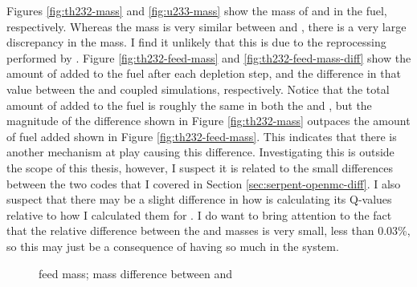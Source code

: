 Figures \ref{fig:th232-mass} and \ref{fig:u233-mass} show the mass of   and
 in the fuel, respectively. Whereas the  mass is very similar
between \OpenMC and \SerpentTWO, there is a very large discrepancy in the 
mass. I find it unlikely that this is due to the reprocessing performed by \SaltProc.
Figure \ref{fig:th232-feed-mass} and \ref{fig:th232-feed-mass-diff} show the 
amount of  added to the fuel after each depletion step, and the
difference in that value between the \OpenMC and \SerpentTWO coupled simulations,
respectively. Notice that the total amount of  added to the fuel
is roughly the same in both the \OpenMC and \SerpentTWO, but the magnitude
of the difference shown in Figure \ref{fig:th232-mass} outpaces the amount of fuel
added shown in Figure \ref{fig:th232-feed-mass}. This indicates that there is another
mechanism at play causing this difference. Investigating this is outside the
scope of this thesis, however, I suspect it is related to the small differences between the two
codes that I covered in Section \ref{sec:serpent-openmc-diff}.
I also suspect that there may be a slight difference in how \SerpentTWO is calculating its
Q-values relative to how I calculated them for \OpenMC. I do want to bring attention to the fact
that the relative difference between the \OpenMC and \SerpentTWO {} masses is very small,
less than 0.03\%, so this may just be a consequence of having so much  in the system.


\begin{figure}[htpb]
    \centering
    \caption[ feed mass]{
      feed mass;
      mass difference between \OpenMC and \SerpentTWO}
    \label{fig:cm242-mass}
\end{figure}

